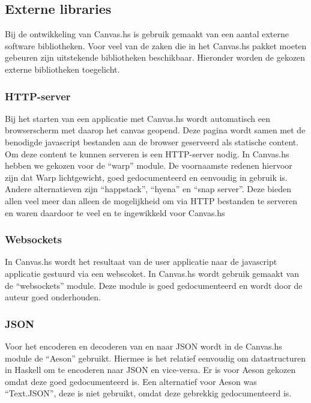 \subsection{Externe libraries}
\label{subsec:externe_libraries}
Bij de ontwikkeling van Canvas.hs is gebruik gemaakt van een aantal externe software bibliotheken. Voor veel van de zaken die in het Canvas.hs pakket moeten gebeuren zijn uitstekende bibliotheken beschikbaar. Hieronder worden de gekozen externe bibliotheken toegelicht.

\subsubsection{HTTP-server}
Bij het starten van een applicatie met Canvas.hs wordt automatisch een browserscherm met daarop het canvas geopend. Deze pagina wordt samen met de benodigde javascript bestanden aan de browser geserveerd als statische content. Om deze content te kunnen serveren is een HTTP-server nodig. In Canvas.hs hebben we gekozen voor de ``warp''\cite{Warp} module. De voornaamste redenen hiervoor zijn dat Warp lichtgewicht, goed gedocumenteerd en eenvoudig in gebruik is. Andere alternatieven zijn ``happstack''\cite{Happstack}, ``hyena''\cite{Hyena} en ``snap server''\cite{SnapServer}. Deze bieden allen veel meer dan alleen de mogelijkheid om via HTTP bestanden te serveren en waren daardoor te veel en te ingewikkeld voor Canvas.hs

\subsubsection{Websockets}
In Canvas.hs wordt het resultaat van de user applicatie naar de javascript applicatie gestuurd via een webscoket. In Canvas.hs wordt gebruik gemaakt van de ``websockets'' \cite{Websockets} module. Deze module is goed gedocumenteerd en wordt door de auteur goed onderhouden.

\subsubsection{JSON}
Voor het encoderen en decoderen van en naar JSON wordt in de Canvas.hs module de ``Aeson''\cite{Aeson} gebruikt. Hiermee is het relatief eenvoudig om datastructuren in Haskell om te encoderen naar JSON en vice-versa. Er is voor Aeson gekozen omdat deze goed gedocumenteerd is. Een alternatief voor Aeson was ``Text.JSON'', deze is niet gebruikt, omdat deze gebrekkig gedocumenteerd is.

